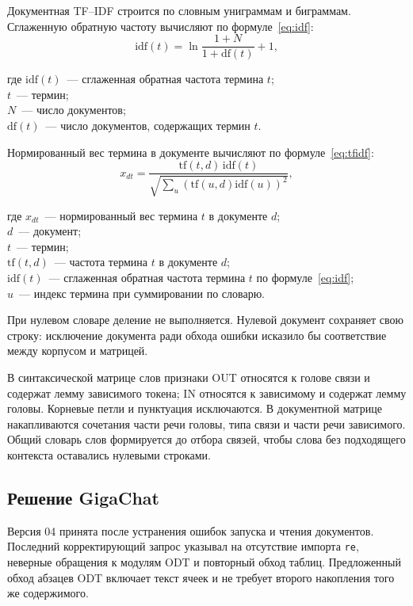 \begin{samepage}
Документная TF--IDF строится по словным униграммам и биграммам. Сглаженную обратную частоту вычисляют по формуле~\eqref{eq:idf}:
\begin{equation}\label{eq:idf}
 \mathrm{idf}(t)=\ln\frac{1+N}{1+\mathrm{df}(t)}+1,
\end{equation}

где $\mathrm{idf}(t)$~--- сглаженная обратная частота термина $t$;\\
$t$~--- термин;\\
$N$~--- число документов;\\
$\mathrm{df}(t)$~--- число документов, содержащих термин $t$.\par
\end{samepage}

\begin{samepage}
Нормированный вес термина в документе вычисляют по формуле~\eqref{eq:tfidf}:
\begin{equation}\label{eq:tfidf}
 x_{dt}=\frac{\mathrm{tf}(t,d)\,\mathrm{idf}(t)}
 {\sqrt{\sum_u(\mathrm{tf}(u,d)\mathrm{idf}(u))^2}},
\end{equation}

где $x_{dt}$~--- нормированный вес термина $t$ в документе $d$;\\
$d$~--- документ;\\
$t$~--- термин;\\
$\mathrm{tf}(t,d)$~--- частота термина $t$ в документе $d$;\\
$\mathrm{idf}(t)$~--- сглаженная обратная частота термина $t$ по формуле~\eqref{eq:idf};\\
$u$~--- индекс термина при суммировании по словарю.\par
\end{samepage}

При нулевом словаре деление не выполняется. Нулевой документ сохраняет свою строку: исключение документа ради обхода ошибки исказило бы соответствие между корпусом и матрицей.

В синтаксической матрице слов признаки OUT относятся к голове связи и содержат лемму зависимого токена; IN относятся к зависимому и содержат лемму головы. Корневые петли и пунктуация исключаются. В документной матрице накапливаются сочетания части речи головы, типа связи и части речи зависимого. Общий словарь слов формируется до отбора связей, чтобы слова без подходящего контекста оставались нулевыми строками.

\subsection{Решение GigaChat}
Версия 04 принята после устранения ошибок запуска и чтения документов. Последний корректирующий запрос указывал на отсутствие импорта \texttt{re}, неверные обращения к модулям ODT и повторный обход таблиц. Предложенный обход абзацев ODT включает текст ячеек и не требует второго накопления того же содержимого.


